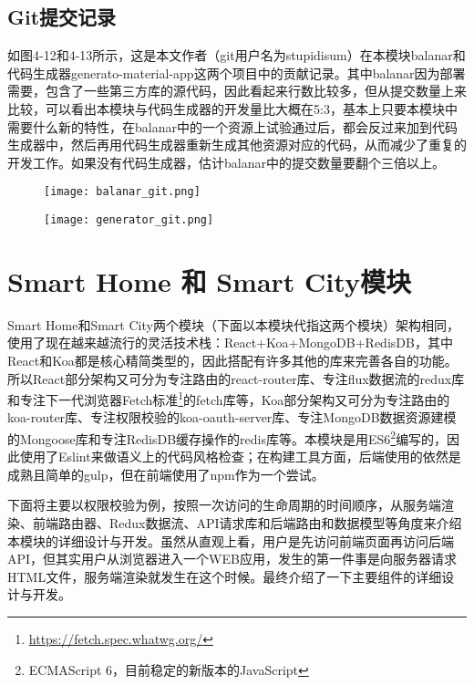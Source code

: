 \subsection{Git提交记录}
如图4-12和4-13所示，这是本文作者（git用户名为stupidisum）在本模块balanar和代码生成器generato-material-app这两个项目中的贡献记录。其中balanar因为部署需要，包含了一些第三方库的源代码，因此看起来行数比较多，但从提交数量上来比较，可以看出本模块与代码生成器的开发量比大概在5:3，基本上只要本模块中需要什么新的特性，在balanar中的一个资源上试验通过后，都会反过来加到代码生成器中，然后再用代码生成器重新生成其他资源对应的代码，从而减少了重复的开发工作。如果没有代码生成器，估计balanar中的提交数量要翻个三倍以上。
\begin{figure}[!htp]
 \centering
 \texttt{[image: balanar\_git.png]}
\end{figure}
\begin{figure}[H]
 \centering
 \texttt{[image: generator\_git.png]}
\end{figure}

\section{Smart Home 和 Smart City模块}
Smart Home和Smart City两个模块（下面以本模块代指这两个模块）架构相同，使用了现在越来越流行的灵活技术栈：React+Koa+MongoDB+RedisDB，其中React和Koa都是核心精简类型的，因此搭配有许多其他的库来完善各自的功能。所以React部分架构又可分为专注路由的react-router库、专注flux数据流的redux库和专注下一代浏览器Fetch标准\footnote{\url{https://fetch.spec.whatwg.org/}}的fetch库等，Koa部分架构又可分为专注路由的koa-router库、专注权限校验的koa-oauth-server库、专注MongoDB数据资源建模的Mongoose库和专注RedisDB缓存操作的redis库等。本模块是用ES6\footnote{ECMAScript 6，目前稳定的新版本的JavaScript}编写的，因此使用了Eslint来做语义上的代码风格检查；在构建工具方面，后端使用的依然是成熟且简单的gulp，但在前端使用了npm作为一个尝试。

下面将主要以权限校验为例，按照一次访问的生命周期的时间顺序，从服务端渲染、前端路由器、Redux数据流、API请求库和后端路由和数据模型等角度来介绍本模块的详细设计与开发。虽然从直观上看，用户是先访问前端页面再访问后端API，但其实用户从浏览器进入一个WEB应用，发生的第一件事是向服务器请求HTML文件，服务端渲染就发生在这个时候。最终介绍了一下主要组件的详细设计与开发。
